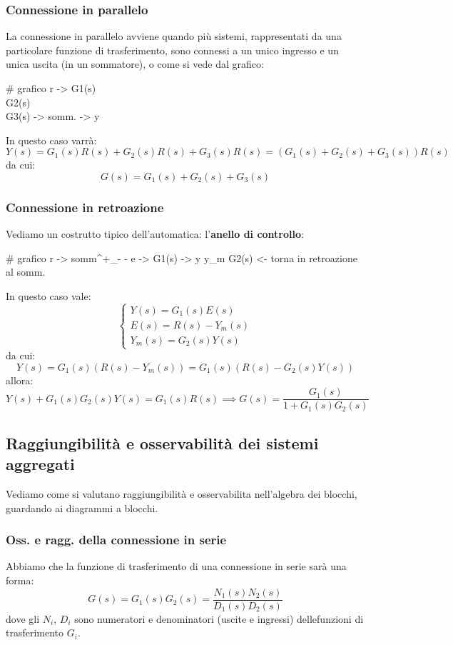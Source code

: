 \documentclass[a4paper,11pt]{article}
\begin{document}
\subsubsection{Connessione in parallelo}
La connessione in parallelo avviene quando più sistemi, rappresentati da una particolare funzione di trasferimento, sono connessi a un unico ingresso e un unica uscita (in un sommatore), o come si vede dal grafico:

# grafico r -> G1(s) \\ G2(s) \\ G3(s) -> somm. -> y

In questo caso varrà:
$$
Y(s) = G_1(s)R(s) + G_2(s)R(s) + G_3(s)R(s) = \left( G_1(s) + G_2(s) + G_3(s) \right) R(s)
$$
da cui:
$$
G(s) = G_1(s) + G_2(s) + G_3(s)
$$

\subsubsection{Connessione in retroazione}
Vediamo un costrutto tipico dell'automatica: l'\textbf{anello di controllo}:

# grafico r -> somm^+_- - e -> G1(s) -> y
										 y_m		G2(s)	<- torna in retroazione al somm.

In questo caso vale:
\[
	\begin{cases}	
		Y(s) = G_1(s) E(s) \\
		E(s) = R(s) - Y_m(s) \\
		Y_m(s) = G_2(s) Y(s)
	\end{cases}
\]
da cui:
$$
Y(s) = G_1(s) \left( R(s) - Y_m(s) \right) = G_1(s) \left( R(s) - G_2(s)Y(s) \right)
$$
allora:
$$
Y(s) + G_1(s)G_2(s) Y(s) = G_1(s) R(s) \implies G(s) = \frac{G_1(s)}{1 + G_1(s) G_2(s)}
$$

\subsection{Raggiungibilità e osservabilità dei sistemi aggregati}
Vediamo come si valutano raggiungibilità e osservabilita nell'algebra dei blocchi, guardando ai diagrammi a blocchi.

\subsubsection{Oss. e ragg. della connessione in serie}
Abbiamo che la funzione di trasferimento di una connessione in serie sarà una forma:
$$
G(s) = G_1(s) G_2(s) = \frac{N_1(s)N_2(s)}{D_1(s)D_2(s)}
$$
dove gli $N_i$, $D_i$ sono numeratori e denominatori (uscite e ingressi) dellefunzioni di trasferimento $G_i$.
\end{document}
